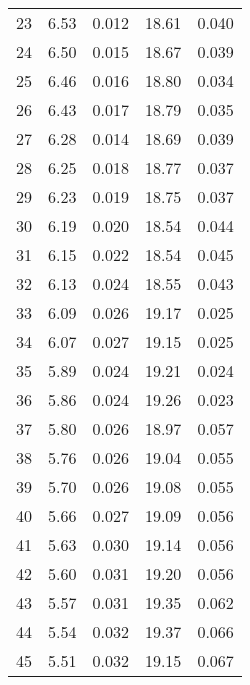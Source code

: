\begin{table}
\begin{tabular}{c|ll|ll}
23 & 6.53 & 0.012 & 18.61 & 0.040 \\
24 & 6.50 & 0.015 & 18.67 & 0.039 \\
25 & 6.46 & 0.016 & 18.80 & 0.034 \\
26 & 6.43 & 0.017 & 18.79 & 0.035 \\
27 & 6.28 & 0.014 & 18.69 & 0.039 \\
28 & 6.25 & 0.018 & 18.77 & 0.037 \\
29 & 6.23 & 0.019 & 18.75 & 0.037 \\
30 & 6.19 & 0.020 & 18.54 & 0.044 \\
31 & 6.15 & 0.022 & 18.54 & 0.045 \\
32 & 6.13 & 0.024 & 18.55 & 0.043 \\
33 & 6.09 & 0.026 & 19.17 & 0.025 \\
34 & 6.07 & 0.027 & 19.15 & 0.025 \\
35 & 5.89 & 0.024 & 19.21 & 0.024 \\
36 & 5.86 & 0.024 & 19.26 & 0.023 \\
37 & 5.80 & 0.026 & 18.97 & 0.057 \\
38 & 5.76 & 0.026 & 19.04 & 0.055 \\
39 & 5.70 & 0.026 & 19.08 & 0.055 \\
40 & 5.66 & 0.027 & 19.09 & 0.056 \\
41 & 5.63 & 0.030 & 19.14 & 0.056 \\
42 & 5.60 & 0.031 & 19.20 & 0.056 \\
43 & 5.57 & 0.031 & 19.35 & 0.062 \\
44 & 5.54 & 0.032 & 19.37 & 0.066 \\
45 & 5.51 & 0.032 & 19.15 & 0.067 \\
               \hline
        \end{tabular}
    \end{table}
    \clearpage

